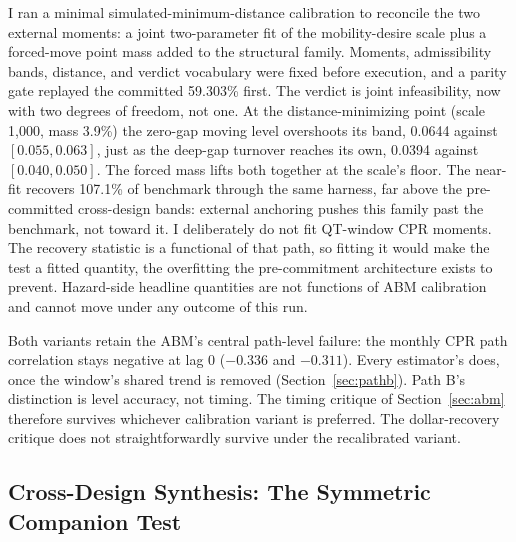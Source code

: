 \documentclass[12pt]{article}
\begin{document}
I ran a minimal simulated-minimum-distance calibration to reconcile the two external moments: a joint two-parameter fit of the mobility-desire scale plus a forced-move point mass added to the structural family. Moments, admissibility bands, distance, and verdict vocabulary were fixed before execution, and a parity gate replayed the committed 59.303\% first. The verdict is joint infeasibility, now with two degrees of freedom, not one. At the distance-minimizing point (scale 1{,}000, mass 3.9\%) the zero-gap moving level overshoots its band, 0.0644 against $[0.055, 0.063]$, just as the deep-gap turnover reaches its own, 0.0394 against $[0.040, 0.050]$. The forced mass lifts both together at the scale's floor. The near-fit recovers 107.1\% of benchmark through the same harness, far above the pre-committed cross-design bands: external anchoring pushes this family past the benchmark, not toward it. I deliberately do not fit QT-window CPR moments. The recovery statistic is a functional of that path, so fitting it would make the test a fitted quantity, the overfitting the pre-commitment architecture exists to prevent. Hazard-side headline quantities are not functions of ABM calibration and cannot move under any outcome of this run.

Both variants retain the ABM's central path-level failure: the monthly CPR path correlation stays negative at lag 0 ($-0.336$ and $-0.311$). Every estimator's does, once the window's shared trend is removed (Section~\ref{sec:pathb}). Path B's distinction is level accuracy, not timing. The timing critique of Section~\ref{sec:abm} therefore survives whichever calibration variant is preferred. The dollar-recovery critique does not straightforwardly survive under the recalibrated variant.

\subsection{Cross-Design Synthesis: The Symmetric Companion Test}\label{sec:robustness-synthesis}
\end{document}
